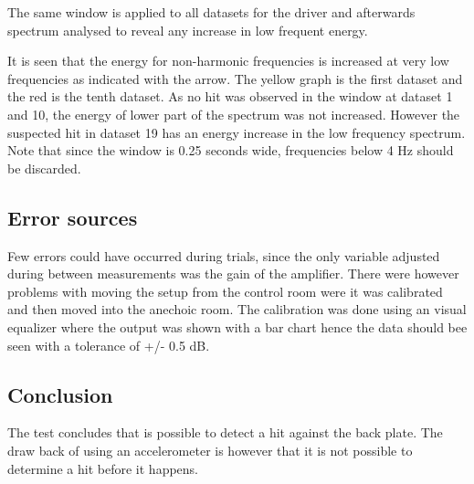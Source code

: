 %	
%	

The same window is applied to all datasets for the driver and afterwards spectrum analysed to reveal any increase in low frequent energy. 

%

It is seen that the energy for non-harmonic frequencies is increased at very low frequencies as indicated with the arrow. The yellow graph is the first dataset and the red is the tenth dataset. As no hit was observed in the window at dataset 1 and 10, the energy of lower part of the spectrum was not increased. However the suspected hit in dataset 19 has an energy increase in the low frequency spectrum. Note that since the window is 0.25 seconds wide, frequencies below 4 Hz should be discarded.

\subsection{Error sources}

Few errors could have occurred during trials, since the only variable adjusted during between measurements was the gain of the amplifier. There were however problems with moving the setup from the control room were it was calibrated and then moved into the anechoic room. The calibration was done using an visual equalizer where the output was shown with a bar chart hence the data should bee seen with a tolerance of +/- 0.5 dB.

\subsection{Conclusion}
The test concludes that is possible to detect a hit against the back plate. The draw back of using an accelerometer is however that it is not possible to determine a hit before it happens. 
